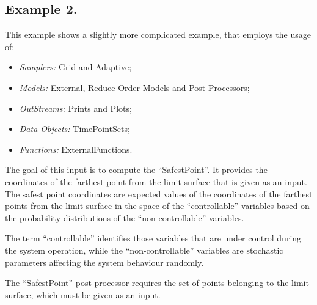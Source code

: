 \subsection{Example 2.}
\label{subsec:ex1}
This example shows a slightly more complicated example, that employs the usage of:
\begin{itemize}
    \item \textit{Samplers:} Grid and Adaptive;
    \item \textit{Models:} External, Reduce Order Models and Post-Processors;
    \item \textit{OutStreams:} Prints and Plots;
    \item \textit{Data Objects:} TimePointSets;
    \item \textit{Functions:} ExternalFunctions.
\end{itemize}
The goal of this input is to compute the ``SafestPoint''.
It provides the coordinates of the farthest
point from the limit surface that is given as an input.
%
The safest point coordinates are expected values of the coordinates of the
farthest points from the limit surface in the space of the ``controllable''
variables based on the probability distributions of the ``non-controllable''
variables.

The term ``controllable'' identifies those variables that are under control
during the system operation, while the ``non-controllable'' variables are
stochastic parameters affecting the system behaviour randomly.

The ``SafestPoint'' post-processor requires the set of points belonging to the
limit surface, which must be given as an input.

